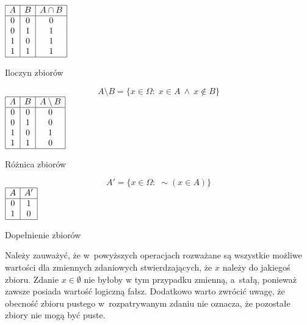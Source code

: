 \documentclass{SGGW-thesis}
\begin{document}
\begin{paragraph}{}
\begin{table}[h]
{        $\begin{array}{|c|c|c|}
            \hline
            A & B & A \cap B \\
            \hline
            0 & 0 & 0 \\
            0 & 1 & 1 \\
            1 & 0 & 1 \\
            1 & 1 & 1 \\
            \hline
        \end{array}$
    \caption{Iloczyn zbiorów}
}
\parbox{.45\linewidth}{
 \centering
\begin{equation}
        A \setminus B = \{x \in \Omega:\; x \in A \:\wedge\: x \notin B\}
\end{equation}
        $\begin{array}{|c|c|c|}
            \hline
            A & B & A \setminus B \\
            \hline
            0 & 0 & 0 \\
            0 & 1 & 0 \\
            1 & 0 & 1 \\
            1 & 1 & 0 \\
            \hline
        \end{array}$
    \caption{Różnica zbiorów}
}
\hspace{1.2cm}
\parbox{.45\linewidth}{
\centering
\begin{equation}
    A' = \{x \in \Omega:\; \sim \left(x \in A \right)\}
\end{equation}
        \vspace{0.45cm}
        $\begin{array}{|c|c|c|}
            \hline
            A & A' \\
            \hline
            0 & 1 \\
            1 & 0 \\
            \hline
        \end{array}$
        \vspace{0.45cm}
    \caption{Dopełnienie zbiorów}
}
\end{table}
\end{paragraph}

\begin{paragraph}{}
    Należy zauważyć, że w~powyższych operacjach rozważane są wszystkie możliwe wartości dla zmiennych zdaniowych stwierdzających, że $x$ należy do jakiegoś zbioru. Zdanie $x \in \emptyset$ nie byłoby w tym przypadku zmienną, a~stałą, ponieważ zawsze posiada wartość logiczną fałsz. Dodatkowo warto zwrócić uwagę, że obecność zbioru pustego w~rozpatrywanym zdaniu nie oznacza, że pozostałe zbiory nie mogą być puste.
\end{paragraph}
\end{document}
